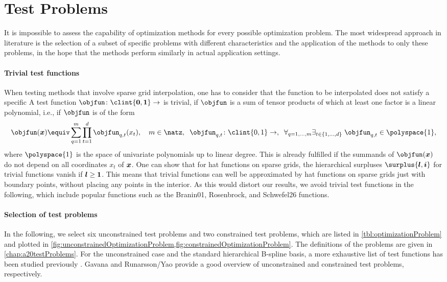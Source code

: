 \section{Test Problems}
\label{sec:53testProblems}

It is impossible to assess the capability of optimization methods
for every possible optimization problem.
The most widespread approach in literature
is the selection of a subset of specific problems
with different characteristics  and
the application of the methods to only these problems,
in the hope that the methods perform similarly in
actual application settings.

\paragraph{Trivial test functions}

When testing methods that involve sparse grid interpolation,
one has to consider that the function to be interpolated
does not satisfy a specific 
A test function $\objfun\colon \clint{\*0, \*1} \to \real$ is trivial, if
$\objfun$ is a sum of tensor products of which at
least one factor is a linear polynomial, i.e., if
$\objfun$ is of the form
\begin{equation}
  \objfun(\*x) \equiv \sum_{q=1}^m \prod_{t=1}^d \objfun_{q,t}(x_t),\quad
  m \in \natz,\;\;
  \objfun_{q,t}\colon \clint{0, 1} \to \real,\;\;
  \faex{q = 1, \dotsc, m}{t \in \{1, \dotsc, d\}}{
    \objfun_{q,t} \in \polyspace{1},
  }
\end{equation}
where $\polyspace{1}$ is the space of univariate polynomials
up to linear degree.
This is already fulfilled if the summands of $\objfun(\*x)$
do not depend on all coordinates $x_t$ of ${\boldsymbol{x}}$.
One can show that for hat functions on sparse grids,
the hierarchical surpluses $\surplus{\*l,\*i}$ for trivial functions
vanish if ${\boldsymbol{l}} \ge {\boldsymbol{1}}$.
This means that trivial functions can well be approximated by hat functions
on sparse grids just with boundary points, without placing any points
in the interior.
As this would distort our results,
we avoid trivial test functions in the following,
which include popular functions such as the
Branin01, Rosenbrock, and Schwefel26 functions.

\paragraph{Selection of test problems}

In the following, we select six unconstrained test problems
and two constrained test problems, which are listed in
\cref{tbl:optimizationProblem} and plotted in
\cref{fig:unconstrainedOptimizationProblem,fig:constrainedOptimizationProblem}.
The definitions of the problems are given in \cref{chap:a20testProblems}.
For the unconstrained case and the standard hierarchical
B-spline basis, a more exhaustive list of test functions has been
studied previously \cite{Valentin14Hierarchische}.
Gavana \cite{Gavana13Global} and Runarsson/Yao \cite{Runarsson00Stochastic}
provide a good overview of unconstrained and constrained test problems,
respectively.

